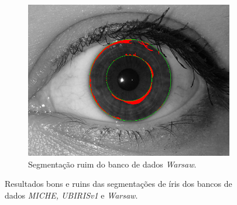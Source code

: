 \begin{figure}[H]
\begin{subfigure}{0.25\textwidth}
  \includegraphics[width=\linewidth]{img/Resultados/warsaw/warsaw_seg_ruim.jpg}
  \caption{Segmentação ruim do banco de dados \textit{\acrshort{Warsaw}}.}
\end{subfigure}
\caption{Resultados bons e ruins das segmentações de íris dos bancos de dados \textit{MICHE, UBIRISv1} e \textit{\acrshort{Warsaw}}.}
\label{fig:experimentos:segmentacoes:todos}
\end{figure}

